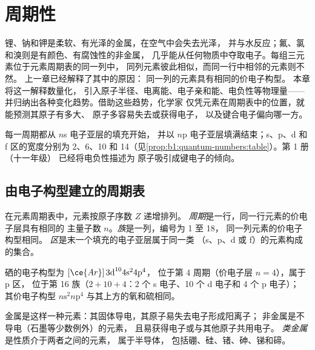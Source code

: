 \chapter{周期性}\label{ch:b1:periodicity}

锂、钠和钾是柔软、有光泽的金属，在空气中会失去光泽，
并与水反应；氟、氯和溴则是有颜色、有腐蚀性的非金属，
几乎能从任何物质中夺取电子。每组三元素位于元素周期表的同一列中，
同列元素彼此相似，而同一行中相邻的元素则不然。
上一章已经解释了其中的原因：
同一列的元素具有相同的价电子构型。
本章将这一解释数量化，
引入原子半径、电离能、电子亲和能、电负性等物理量——
并归纳出各种变化趋势。借助这些趋势，化学家
仅凭元素在周期表中的位置，就能预测其原子有多大、
原子多容易失去或获得电子，
以及键合电子偏向哪一方。

\begin{recall}
每一周期都从 $n$s 电子亚层的填充开始，
并以 $n$p 电子亚层填满结束；s、p、d 和 f 区的宽度分别为 2、6、10
和 14（见\cref{prop:b1:quantum-numbers:table}）。第 1 册（十一年级）
已经将电负性描述为
原子吸引成键电子的倾向。
\end{recall}

\section{由电子构型建立的周期表}

\begin{definition}[周期、族、区]\label{def:b1:periodicity:table}
在元素周期表中，元素按原子序数 $Z$ 递增排列。
\emph{周期}是一行，同一行元素的价电子层具有相同的
主量子数 $n$。\emph{族}是一列，编号为 1 至 18，
同一列元素的价电子构型相同。
\emph{区}是末一个填充的电子亚层属于同一类
（s、p、d 或 f）的元素构成的集合。
\end{definition}

\begin{example}[判断元素的位置]\label{ex:b1:periodicity:position}
硒的电子构型为 $[\ce{Ar}]\,3\text{d}^{10} 4\text{s}^2 4\text{p}^4$，
位于第 4 周期（价电子层 $n = 4$），属于 p 区，
位于第 16 族（$2 + 10 + 4$：2 个 s 电子、10 个 d 电子和 4 个 p 电子）；
其价电子构型 $n\text{s}^2 n\text{p}^4$ 与其上方的氧和硫相同。
\end{example}

\begin{definition}\label{def:b1:periodicity:metalloid}
金属是这样一种元素：其固体导电，其原子易失去电子形成阳离子；
非金属是不导电（石墨等少数例外）的元素，
且易获得电子或与其他原子共用电子。
\emph{类金属}是性质介于两者之间的元素，
属于半导体，
包括硼、硅、锗、砷、锑和碲。
\end{definition}

